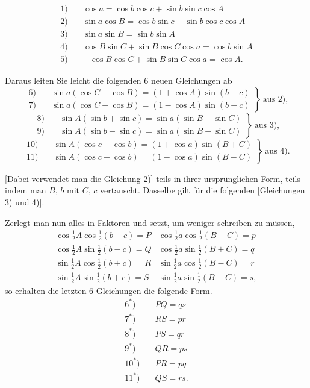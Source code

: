 \[
\begin{aligned}
1) \quad & \cos a = \cos b \cos c + \sin b \sin c \cos A \\
2) \quad & \sin a \cos B = \cos b \sin c - \sin b \cos c \cos A \\
3) \quad & \sin a \sin B = \sin b \sin A \\
4) \quad & \cos B \sin C + \sin B \cos C \cos a = \cos b \sin A \\
5) \quad & -\cos B \cos C + \sin B \sin C \cos a = \cos A.
\end{aligned}
\]

Daraus leiten Sie leicht die folgenden 6 neuen Gleichungen ab
\[
\left.\begin{aligned}
6) \quad & \sin a(\cos C - \cos B) = (1+\cos A)\sin(b-c) \\
7) \quad & \sin a(\cos C + \cos B) = (1-\cos A)\sin(b+c)
\end{aligned}\right\}\ \text{aus 2),}
\]
\[
\left.\begin{aligned}
8) \quad & \sin A(\sin b + \sin c) = \sin a(\sin B + \sin C) \\
9) \quad & \sin A(\sin b - \sin c) = \sin a(\sin B - \sin C)
\end{aligned}\right\}\ \text{aus 3),}
\]
\[
\left.\begin{aligned}
10) \quad & \sin A(\cos c + \cos b) = (1+\cos a)\sin(B+C) \\
11) \quad & \sin A(\cos c - \cos b) = (1-\cos a)\sin(B-C)
\end{aligned}\right\}\ \text{aus 4).}
\]

[Dabei verwendet man die Gleichung 2)] teils in ihrer ursprünglichen Form,
teils indem man $B$, $b$ mit $C$, $c$ vertauscht. Dasselbe gilt für die
folgenden [Gleichungen 3) und 4)].

Zerlegt man nun alles in Faktoren und setzt, um weniger
schreiben zu müssen,
\[
\begin{array}{ll}
\cos \tfrac12 A \cos \tfrac12 (b-c) = P & \cos \tfrac12 a \cos \tfrac12 (B+C) = p \\[4pt]
\cos \tfrac12 A \sin \tfrac12 (b-c) = Q & \cos \tfrac12 a \sin \tfrac12 (B+C) = q \\[4pt]
\sin \tfrac12 A \cos \tfrac12 (b+c) = R & \sin \tfrac12 a \cos \tfrac12 (B-C) = r \\[4pt]
\sin \tfrac12 A \sin \tfrac12 (b+c) = S & \sin \tfrac12 a \sin \tfrac12 (B-C) = s,
\end{array}
\]
so erhalten die letzten 6 Gleichungen die folgende Form.
\[
\begin{aligned}
6^\ast) \quad & PQ = qs \\
7^\ast) \quad & RS = pr \\
8^\ast) \quad & PS = qr \\
9^\ast) \quad & QR = ps \\
10^\ast) \quad & PR = pq \\
11^\ast) \quad & QS = rs.
\end{aligned}
\]
